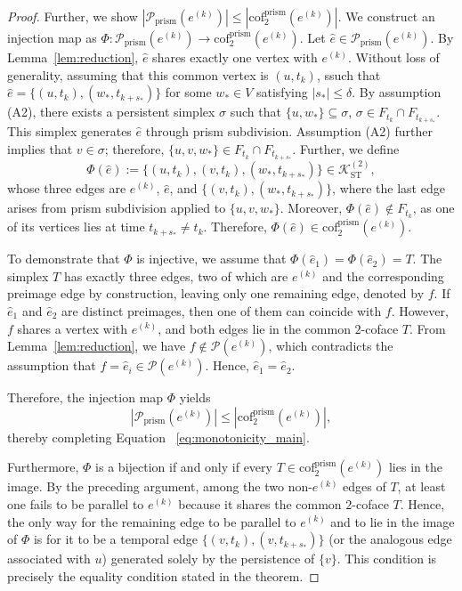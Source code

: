 \documentclass[10pt,a4paper]{amsart}
\newcommand{\K}{\mathcal{K}}
\begin{document}
\begin{proof}
Further, we show $|\mathcal{P}_{\mathrm{prism}}(e^{(k)})| \le |\mathrm{cof}_2^{\mathrm{prism}}(e^{(k)})|$.
We construct an injection map as $\Phi: \mathcal{P}_{\mathrm{prism}}(e^{(k)}) \to \mathrm{cof}_2^{\mathrm{prism}}(e^{(k)})$.
Let $\hat e \in \mathcal{P}_{\mathrm{prism}}(e^{(k)})$.
By Lemma~\ref{lem:reduction}, $\hat e$ shares exactly one vertex with $e^{(k)}$. Without loss of generality, assuming that this common vertex is $(u, t_k)$, ssuch that $\hat e = \{(u, t_k), (w_*, t_{k+s_*})\}$ for some $w_* \in V$ satisfying $|s_*| \le \delta$.
By assumption (A2), there exists a persistent simplex $\sigma$ such that $\{u, w_*\} \subseteq \sigma$, $\sigma \in F_{t_k} \cap F_{t_{k+s_*}}$. This simplex generates $\hat e$ through prism subdivision. Assumption (A2) further implies that $v \in \sigma$; therefore, $\{u, v, w_*\} \in F_{t_k} \cap F_{t_{k+s_*}}$.
Further, we define
\begin{equation*}
\Phi(\hat e) := \{(u, t_k), (v, t_k), (w_*, t_{k+s_*})\} \in \K_{\mathrm{ST}}^{(2)},
\end{equation*}
whose three edges are $e^{(k)}$, $\hat e$, and $\{(v, t_k), (w_*, t_{k+s_*})\}$, where the last edge arises from prism subdivision applied to $\{u, v, w_*\}$.
Moreover, $\Phi(\hat e) \notin F_{t_k}$, as one of its vertices lies at time $t_{k+s_*} \neq t_k$. Therefore, $\Phi(\hat e) \in \mathrm{cof}_2^{\mathrm{prism}}(e^{(k)})$.

To demonstrate that $\Phi$ is injective, we assume that $\Phi(\hat e_1) = \Phi(\hat e_2) = T$.
The simplex $T$ has exactly three edges, two of which are $e^{(k)}$ and the corresponding preimage edge by construction, leaving only one remaining edge, denoted by $f$.
If $\hat e_1$ and $\hat e_2$ are distinct preimages, then one of them can coincide with $f$. However, $f$ shares a vertex with $e^{(k)}$, and both edges lie in the common $2$-coface $T$.
From Lemma~\ref{lem:reduction}, we have $f \notin \mathcal{P}(e^{(k)})$, which contradicts the assumption that $f = \hat e_i \in \mathcal{P}(e^{(k)})$.
Hence, $\hat e_1 = \hat e_2$.

Therefore, the injection map $\Phi$ yields
\begin{equation*}
|\mathcal{P}_{\mathrm{prism}}(e^{(k)})| \le |\mathrm{cof}_2^{\mathrm{prism}}(e^{(k)})|,
\end{equation*}
thereby completing Equation ~\eqref{eq:monotonicity_main}.

Furthermore, $\Phi$ is a bijection if and only if every $T \in \mathrm{cof}_2^{\mathrm{prism}}(e^{(k)})$ lies in the image.
By the preceding argument, among the two non-$e^{(k)}$ edges of $T$, at least one fails to be parallel to $e^{(k)}$ because it shares the common $2$-coface $T$.
Hence, the only way for the remaining edge to be parallel to $e^{(k)}$ and to lie in the image of $\Phi$ is for it to be a temporal edge $\{(v, t_k), (v, t_{k+s_*})\}$ (or the analogous edge associated with $u$) generated solely by the persistence of $\{v\}$.
This condition is precisely the equality condition stated in the theorem.
\end{proof}
\end{document}
